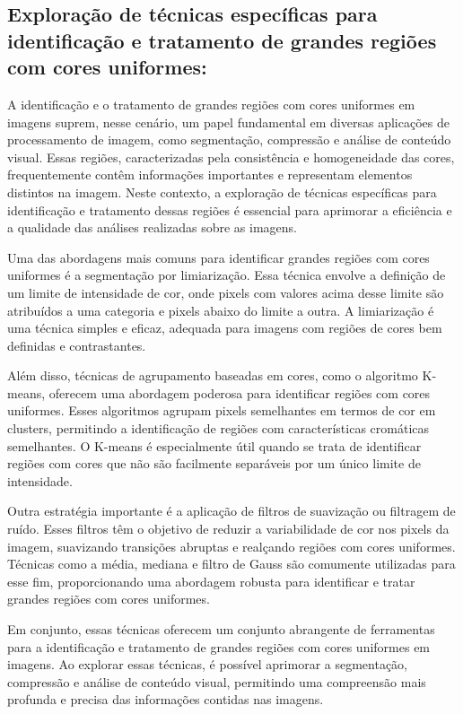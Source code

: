 \documentclass{article}
\begin{document}
\subsection{Exploração de técnicas específicas para identificação e tratamento de grandes regiões com cores uniformes:}

A identificação e o tratamento de grandes regiões com cores uniformes em imagens suprem, nesse cenário, um papel fundamental em diversas aplicações de processamento de imagem, como segmentação, compressão e análise de conteúdo visual. Essas regiões, caracterizadas pela consistência e homogeneidade das cores, frequentemente contêm informações importantes e representam elementos distintos na imagem. Neste contexto, a exploração de técnicas específicas para identificação e tratamento dessas regiões é essencial para aprimorar a eficiência e a qualidade das análises realizadas sobre as imagens.

Uma das abordagens mais comuns para identificar grandes regiões com cores uniformes é a segmentação por limiarização. Essa técnica envolve a definição de um limite de intensidade de cor, onde pixels com valores acima desse limite são atribuídos a uma categoria e pixels abaixo do limite a outra. A limiarização é uma técnica simples e eficaz, adequada para imagens com regiões de cores bem definidas e contrastantes.

Além disso, técnicas de agrupamento baseadas em cores, como o algoritmo K-means, oferecem uma abordagem poderosa para identificar regiões com cores uniformes. Esses algoritmos agrupam pixels semelhantes em termos de cor em clusters, permitindo a identificação de regiões com características cromáticas semelhantes. O K-means é especialmente útil quando se trata de identificar regiões com cores que não são facilmente separáveis por um único limite de intensidade.

Outra estratégia importante é a aplicação de filtros de suavização ou filtragem de ruído. Esses filtros têm o objetivo de reduzir a variabilidade de cor nos pixels da imagem, suavizando transições abruptas e realçando regiões com cores uniformes. Técnicas como a média, mediana e filtro de Gauss são comumente utilizadas para esse fim, proporcionando uma abordagem robusta para identificar e tratar grandes regiões com cores uniformes.

Em conjunto, essas técnicas oferecem um conjunto abrangente de ferramentas para a identificação e tratamento de grandes regiões com cores uniformes em imagens. Ao explorar essas técnicas, é possível aprimorar a segmentação, compressão e análise de conteúdo visual, permitindo uma compreensão mais profunda e precisa das informações contidas nas imagens.
\end{document}
